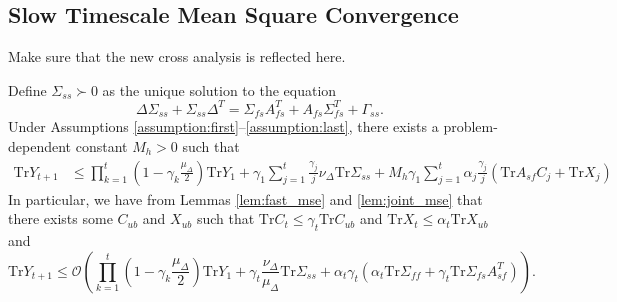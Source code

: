 \subsection{Slow Timescale Mean Square Convergence}\label{sec:slow_mse}
{\color{red}Make sure that the new cross analysis is reflected here. }
\begin{lemma}\label{lem:slow_mse}
    Define $\Sigma_{ss} \succ 0$ as the unique solution to the equation
    \begin{equation}
        \Delta \Sigma_{ss} + \Sigma_{ss} \Delta^T 
        = \Sigma_{fs} A_{fs}^T + A_{fs} \Sigma_{fs}^T + \Gamma_{ss} .         
    \end{equation}
    Under Assumptions \ref{assumption:first}--\ref{assumption:last}, there exists a problem-dependent constant $M_h > 0$ such that
    \begin{align*}
        \mathrm{Tr} Y_{t+1} 
        &
        \leq  
        \prod_{k=1}^t \left(1 - \gamma_k \frac{\mu_\Delta}{2}\right) \mathrm{Tr} Y_1
        + \gamma_1 \sum_{j=1}^t \frac{\gamma_j}{j} \nu_\Delta \mathrm{Tr} \Sigma_{ss} 
        + M_h \gamma_1 \sum_{j=1}^t \alpha_j \frac{\gamma_j}{j} \left(\mathrm{Tr} A_{sf} C_j  + \mathrm{Tr} X_j\right) 
    \end{align*}
    In particular, we have from Lemmas \ref{lem:fast_mse} and \ref{lem:joint_mse} that there exists some $C_{ub}$ and $X_{ub}$ such that $\mathrm{Tr} C_t \leq \gamma_t \mathrm{Tr} C_{ub}$ and $\mathrm{Tr} X_t \leq \alpha_t \mathrm{Tr}X_{ub}$ and
    \begin{equation}
        \mathrm{Tr} Y_{t+1} \leq \mathcal{O}\left(
            \prod_{k=1}^t \left(1 - \gamma_k \frac{\mu_\Delta}{2}\right) \mathrm{Tr} Y_1
            + \gamma_t \frac{\nu_\Delta}{\mu_\Delta} \mathrm{Tr} \Sigma_{ss} + \alpha_t \gamma_t (\alpha_t \mathrm{Tr} \Sigma_{ff} + \gamma_t \mathrm{Tr} \Sigma_{fs} A_{sf}^T) 
        \right) .
    \end{equation}
\end{lemma}

